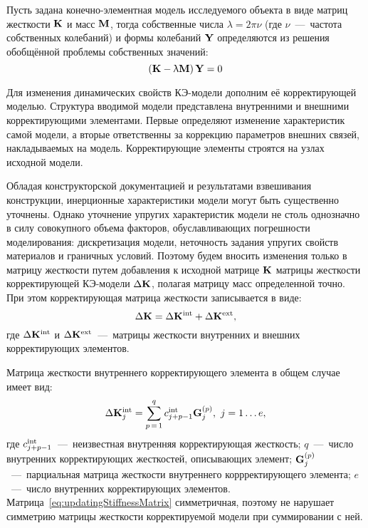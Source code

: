 Пусть задана конечно-элементная модель исследуемого объекта в виде матриц жесткости $ \mathbf{K} $ и масс $ \mathbf{M} $, тогда собственные числа $ \lambda = 2 \pi \nu $ (где $ \nu $~---~частота собственных колебаний) и формы колебаний $ \mathbf{Y} $ определяются из решения обобщённой проблемы собственных значений:
\begin{equation}
	\left( \mathbf{K} - \uplambda \mathbf{M} \right) \mathbf{Y} = 0
\end{equation}

Для изменения динамических свойств КЭ-модели дополним её корректирующей моделью. Структура вводимой модели представлена внутренними и внешними корректирующими элементами. Первые определяют изменение характеристик самой модели, а вторые ответственны за коррекцию параметров внешних связей, накладываемых на модель. Корректирующие элементы строятся на узлах исходной модели. 

Обладая конструкторской документацией и результатами взвешивания конструкции, инерционные характеристики модели могут быть существенно уточнены. Однако уточнение упругих характеристик модели не столь однозначно в силу совокупного объема факторов, обуславливающих погрешности моделирования: дискретизация модели, неточность задания упругих свойств материалов и граничных условий. Поэтому будем вносить изменения только в матрицу жесткости путем добавления к исходной матрице $ \mathbf{K} $ матрицы жесткости корректирующей КЭ-модели $ \Delta \mathbf{K} $, полагая матрицу масс определенной точно. При этом корректирующая матрица жесткости записывается в виде:
\begin{equation}
	\Delta \mathbf{K} = \Delta \mathbf{K} ^ {\text{int}} + \Delta \mathbf{K} ^ {\text{ext}}, \label{eq:stiffMatrixDecomposition}
\end{equation}
где $ \Delta \mathbf{K} ^ {\text{int}} $ и $ \Delta \mathbf{K} ^ {\text{ext}} $~---~матрицы жесткости внутренних и внешних корректирующих элементов.

Матрица жесткости внутреннего корректирующего элемента в общем случае имеет вид:
\begin{equation}
	\Delta \mathbf{K} ^ {\text{int}}_j = \sum\limits_{p\,=\,1}^{q} c ^ {\text{int}}_{j+p-1} \mathbf{G}_j^{(p)}, \ j = 1 \hdots e, \label{eq:updatingStiffnessMatrix}
\end{equation}
где $ c ^ {\text{int}}_{j+p-1} $~---~неизвестная внутренняя корректирующая жесткость; $ q $~---~число внутренних корректирующих жесткостей, описывающих элемент; $ \mathbf{G}_j^{(p)} $~---~парциальная матрица жесткости внутреннего коррректирующего элемента; $ e $~---~число внутренних корректирующих элементов. Матрица~\eqref{eq:updatingStiffnessMatrix} симметричная, поэтому не нарушает симметрию матрицы жесткости корректируемой модели при суммировании с ней.

